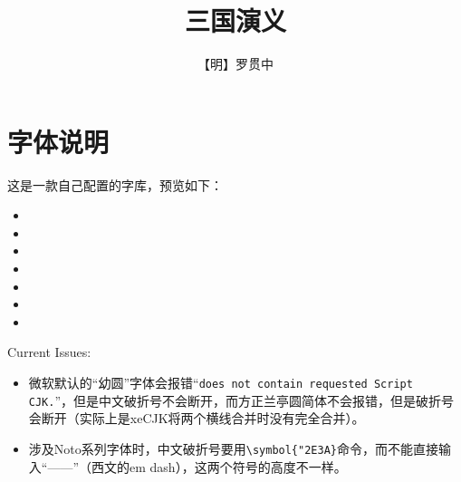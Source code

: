 \documentclass[a4paper]{article}
\begin{document}
\Large

\section*{字体说明}

\noindent 这是一款自己配置的字库，预览如下：

\begin{itemize}
    \item[1.] 

    \item[2.] 

    \item[3.] 

    \item[4.] 

    \item[5.] 

    \item[6.] 

    \item[7.] 
\end{itemize}

\noindent \textsf{Current Issues:}

\begin{itemize}
    \item 微软默认的“幼圆”字体会报错“\texttt{does not contain requested Script CJK.}”，但是中文破折号不会断开，而方正兰亭圆简体不会报错，但是破折号会断开（实际上是xeCJK将两个横线合并时没有完全合并）。
    \item 涉及Noto系列字体时，中文破折号要用\texttt{\textbackslash symbol\{"2E3A\}}命令，而不能直接输入“——”（西文的em dash），这两个符号的高度不一样。
\end{itemize}

\newpage
\title{\Huge\textbf{三国演义}}
\author{\huge【明】罗贯中}
\date{}
\maketitle
\end{document}
